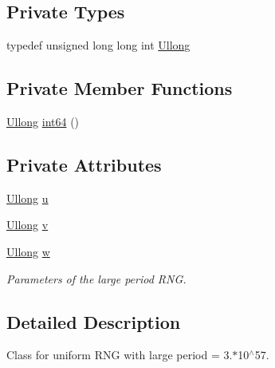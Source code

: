 \subsection*{Private Types}
\begin{DoxyCompactItemize}
\item 
typedef unsigned long long int \hyperlink{class_c_large_period_r_n_g_aaf7ace659133533b97464a9b7538948d}{Ullong}
\end{DoxyCompactItemize}
\subsection*{Private Member Functions}
\begin{DoxyCompactItemize}
\item 
\hyperlink{class_c_large_period_r_n_g_aaf7ace659133533b97464a9b7538948d}{Ullong} \hyperlink{class_c_large_period_r_n_g_a9c27e33ab2331e36123d00d8861aed92}{int64} ()
\end{DoxyCompactItemize}
\subsection*{Private Attributes}
\begin{DoxyCompactItemize}
\item 
\hyperlink{class_c_large_period_r_n_g_aaf7ace659133533b97464a9b7538948d}{Ullong} \hyperlink{class_c_large_period_r_n_g_a6255887a06808f9fe85a65ff86c8fd69}{u}
\item 
\hyperlink{class_c_large_period_r_n_g_aaf7ace659133533b97464a9b7538948d}{Ullong} \hyperlink{class_c_large_period_r_n_g_a544988a3f0eaa81c2eacb9ac8b605c36}{v}
\item 
\hyperlink{class_c_large_period_r_n_g_aaf7ace659133533b97464a9b7538948d}{Ullong} \hyperlink{class_c_large_period_r_n_g_ab26b2dfa899104bb2725f54397df314b}{w}
\begin{DoxyCompactList}\small\item\em Parameters of the large period R\-N\-G. \end{DoxyCompactList}\end{DoxyCompactItemize}


\subsection{Detailed Description}
Class for uniform R\-N\-G with large period = 3.$\ast$10$^\wedge$57. 

